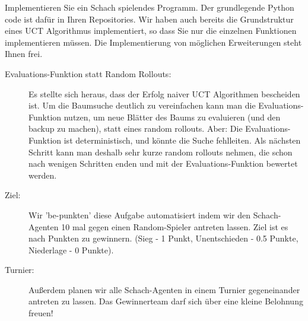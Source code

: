 

\renewcommand{\course}{Artificial Intelligence}
\renewcommand{\coursepicture}{course_ai}
\renewcommand{\coursedate}{Winter 2019}
\renewcommand{\exnum}{2}

\exercises



Implementieren Sie ein Schach spielendes Programm. Der grundlegende
Python code ist dafür in Ihren Repositories. Wir haben auch bereits
die Grundstruktur eines UCT Algorithmus implementiert, so dass Sie
nur die einzelnen Funktionen implementieren müssen. Die Implementierung von möglichen Erweiterungen steht Ihnen frei. 
\begin{description}

\item[Evaluations-Funktion statt Random Rollouts:] 
Es stellte sich heraus, dass der Erfolg naiver UCT Algorithmen
bescheiden ist.  Um die Baumsuche deutlich zu vereinfachen kann man die
Evaluations-Funktion nutzen, um neue Blätter des Baums zu evaluieren (und
    den backup zu machen), statt eines random rollouts. Aber: Die
    Evaluations-Funktion ist deterministisch, und könnte die Suche
    fehlleiten. Als nächsten Schritt kann man deshalb sehr kurze random
    rollouts nehmen, die schon nach wenigen Schritten enden und mit der
    Evaluations-Funktion bewertet werden.

\item[Ziel:] Wir 'be-punkten' diese Aufgabe automatisiert
    indem wir den Schach-Agenten 10 mal gegen einen Random-Spieler
    antreten lassen. Ziel ist es nach Punkten zu gewinnern. (Sieg - 1 Punkt, Unentschieden - 0.5 Punkte, Niederlage - 0 Punkte).


\item[Turnier:] Außerdem planen wir alle Schach-Agenten in einem Turnier gegeneinander antreten zu lassen. Das Gewinnerteam darf sich über eine kleine Belohnung freuen!

\end{description}

